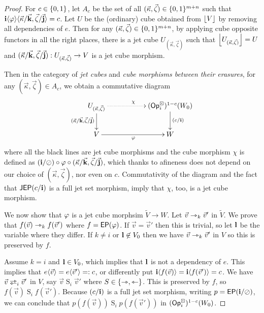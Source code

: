 \documentclass[a4paper]{article}
\begin{document}
\begin{proof}
	For $c \in \mathopen{}\left\{ 0, 1 \right\}\mathclose{}$, let $A_c$ be the set of all $(\vec \kappa, \vec \zeta) \in \mathopen{}\left\{ 0, 1 \right\}\mathclose{}^{m+n}$ such that $\mathbf{i} \langle \varphi \rangle \langle \vec \kappa / \vec{\mathbf{k}}, \vec \zeta / \vec{\mathbf{j}} \rangle = c$.
	Let $U$ be the (ordinary) cube obtained from $\mathopen{}\left\lfloor V \right\rfloor\mathclose{}$ by removing all dependencies of $e$.
	Then for any $(\vec \kappa, \vec \zeta) \in \mathopen{}\left\{ 0, 1 \right\}\mathclose{}^{m+n}$, by applying cube opposite functors in all the right places, there is a jet cube $U_{(\vec \kappa, \vec \zeta)}$ such that $\mathopen{}\left\lfloor U_{(\vec \kappa, \vec \zeta)} \right\rfloor\mathclose{} = U$ and $(\vec \kappa / \vec{\mathbf{k}}, \vec \zeta / \vec{\mathbf{j}}) : U_{(\vec \kappa, \vec \zeta)} \to V$ is a jet cube morphism.
	
	Then in the category of \emph{jet cubes} and \emph{cube morphisms between their erasures}, for any $(\vec \kappa, \vec \zeta) \in A_c$, we obtain a commutative diagram
	\[
		\xymatrix{
			U_{(\vec \kappa, \vec \zeta)}
				\ar[d]_{(\vec \kappa / \vec{\dm k}, \vec \zeta / \vec{\dm j})}
				\ar@{.>}[rr]^\chi
			&&
			(\Opcube_i)^{1-c}(W_0)
				\ar[d]^{(c/\dm i)}
			\\
			V
				\ar[rr]_{\vfi}
			&&
			W
		}
	\]
	where all the black lines are jet cube morphisms and the cube morphism $\chi$ is defined as $(\mathbf{i} / \oslash) \circ \varphi \circ (\vec \kappa / \vec{\mathbf{k}}, \vec \zeta / \vec{\mathbf{j}})$, which thanks to afineness does not depend on our choice of $(\vec \kappa, \vec \zeta)$, nor even on $c$.
	Commutativity of the diagram and the fact that $\mathsf{JEP}(c/\mathbf{i})$ is a full jet set morphism, imply that $\chi$, too, is a jet cube morphism.
	
	We now show that $\varphi$ is a jet cube morphsim $\tilde V \to W$.
	Let $\vec v \rightarrowtriangle_k \vec v'$ in $\tilde V$.
	We prove that $f(\vec v) \rightarrowtriangle_k f(\vec v')$ where $f = \mathsf{EP}(\varphi)$.
	If $\vec v = \vec v'$ then this is trivial, so let $\mathbf{l}$ be the variable where they differ.
	If $k \neq i$ or $\mathbf{l} \not\in V_0$ then we have $\vec v \rightarrowtriangle_k \vec v'$ in $V$ so this is preserved by $f$.
	
	Assume $k = i$ and $\mathbf{l} \in V_0$, which implies that $\mathbf{l}$ is not a dependency of $e$.
	This implies that $e \langle \vec v \rangle = e \langle \vec v' \rangle =: c$, or differently put $\mathbf{i} \langle f(\vec v) \rangle = \mathbf{i} \langle f(\vec v') \rangle = c$.
	We have $\vec v \infrajet_i \vec v'$ in $V$, say $\vec v \mathrel{S}_i \vec v'$ where $S \in \mathopen{}\left\{ \rightarrowtriangle, \leftarrowtriangle \right\}\mathclose{}$.
	This is preserved by $f$, so $f(\vec v) \mathrel{S}_i f(\vec v')$.
	Because $(c/\mathbf{i})$ is a full jet set morphism, writing $p = \mathsf{EP}(\mathbf{i} / \oslash)$, we can conclude that $p(f(\vec v)) \mathrel{S}_i p(f(\vec v'))$ in $({\mathsf{Op}}^\boxdot_i)^{1-c}(W_0)$.
	

\end{proof}
\end{document}
